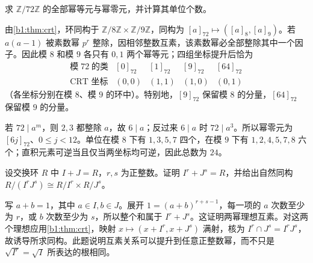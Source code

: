 \begin{exercise}\label{b1:ex:10-mod-seventy-two}
	求 \(\mathbb Z/72\mathbb Z\) 的全部幂等元与幂零元，并计算其单位个数。
\end{exercise}
\begin{solution}
	由\cref{b1:thm:crt}，环同构于 \(\mathbb Z/8\mathbb Z\times\mathbb Z/9\mathbb Z\)，同构为 \([a]_{72}\mapsto([a]_8,[a]_9)\)。若 \(a(a-1)\) 被素数幂 \(p^r\) 整除，因相邻整数互素，该素数幂必全部整除其中一个因子。因此模 \(8\) 和模 \(9\) 各只有 \(0,1\) 两个幂等元；四组坐标提升后恰为
	\[
		\begin{array}{c|cccc}
			\text{模}\;72\;\text{的类}&[0]_{72}&[1]_{72}&[9]_{72}&[64]_{72}\\\hline \text{CRT 坐标}&(0,0)&(1,1)&(1,0)&(0,1)
		\end{array}
	\]
	（各坐标分别在模 \(8\)、模 \(9\) 的环中）。特别地，\([9]_{72}\) 保留模 \(8\) 的分量，\([64]_{72}\) 保留模 \(9\) 的分量。

	若 \(72\mid a^m\)，则 \(2,3\) 都整除 \(a\)，故 \(6\mid a\)；反过来 \(6\mid a\) 时 \(72\mid a^3\)。所以幂零元为 \([6j]_{72}\)、\(0\leq j<12\)。单位在模 \(8\) 下有 \(1,3,5,7\) 四个，在模 \(9\) 下有 \(1,2,4,5,7,8\) 六个；直积元素可逆当且仅当两坐标均可逆，因此总数为 \(24\)。
\end{solution}

\begin{exercise}\label{b1:ex:10-comaximal-powers}
	设交换环 \(R\) 中 \(I+J=R\)，\(r,s\) 为正整数。证明 \(I^r+J^s=R\)，并给出自然同构 \(R/(I^rJ^s)\cong R/I^r\times R/J^s\)。
\end{exercise}
\begin{solution}
	写 \(a+b=1\)，其中 \(a\in I,b\in J\)。展开 \(1=(a+b)^{r+s-1}\)，每一项的 \(a\) 次数至少为 \(r\)，或 \(b\) 次数至少为 \(s\)，所以整个和属于 \(I^r+J^s\)。这证明两幂理想互素。对这两个理想应用\cref{b1:thm:crt}，映射 \(x\mapsto(x+I^r,x+J^s)\) 满射，核为 \(I^r\cap J^s=I^rJ^s\)，故诱导所求同构。此题说明互素关系可以提升到任意正整数幂，而不只是 \(\sqrt{I^r}=\sqrt I\) 所表达的根相同。
\end{solution}

